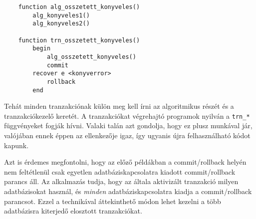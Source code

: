 \begin{verbatim}
    function alg_osszetett_konyveles()
        alg_konyveles1()
        alg_konyveles2()

    function trn_osszetett_konyveles() 
        begin
            alg_osszetett_konyveles()
            commit
        recover e <konyverror>
            rollback
        end
\end{verbatim}
Tehát minden tranzakciónak külön meg kell írni az
algoritmikus részét és a tranzakciókezelő keretét.
A tranzakciókat végrehajtó programok nyilván a
\verb!trn_*! függvényeket fogják hívni.
Valaki talán azt gondolja, hogy ez plusz munkával jár,
valójában ennek éppen az ellenkezője igaz, így ugyanis újra 
felhasználható kódot kapunk.

 
Azt is érdemes megfontolni, hogy az előző példákban
a commit/rollback helyén nem feltétlenül csak egyetlen adatbáziskapcsolatra
kiadott commit/rollback parancs áll. Az alkalmazás tudja, hogy
az általa aktivizált tranzakció milyen adatbázisokat használ,
és {\em minden\/} adatbáziskapcsolatra kiadja a commit/rollback parancsot.
Ezzel a technikával áttekinthető módon lehet kezelni
a több adatbázisra kiterjedő elosztott tranzakciókat.


